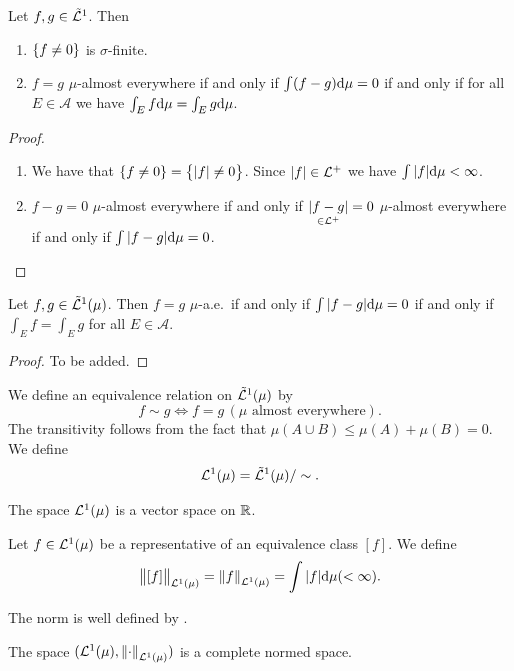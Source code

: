 \documentclass[11pt,a4paper]{article}
\newcommand{\A}{\mathcal A}
\begin{document}
\begin{proposition}
  Let $f,g \in \tilde{\mathcal{L}}^1$. Then
  \begin{enumerate}
    \item[(1)] $\left\{f \neq 0\right\}$ is $\sigma$-finite.
    \item[(2)] $f = g$ $\mu$-almost everywhere if and only if
      $\int (f - g) \mathrm{d} \mu = 0$ if and only if for all $E \in \A$ we have
      $\int_{E} f \mathrm{d} \mu = \int_{E} g \mathrm{d} \mu$.
  \end{enumerate}
\end{proposition}
\begin{proof} \phantom{}
\begin{enumerate}
  \item[(1)] We have that $\left\{f \neq 0\right\} = \left\{|f| \neq 0\right\}$.
    Since $|f| \in \mathcal{L}^+$ we have $\int |f| \mathrm{d} \mu < \infty$.
  \item[(2)] $f - g = 0$ $\mu$-almost everywhere if and only if
    $\underset{\in \mathcal{L}^+}{|f - g|} = 0$ $\mu$-almost everywhere if and only
    if $\int |f - g| \mathrm{d} \mu = 0$.
\end{enumerate}
\end{proof}

\begin{proposition}
  \label{prp:equal-a-e-implies-equal-integral}
  Let $f,g \in \tilde{\mathcal{L}}^1(\mu)$.
  Then $f = g$ $\mu$-a.e.\ if and only if
  $\int |f - g| \mathrm{d} \mu = 0$ if and only if $\int_{E} f = \int_{E} g$ for all
  $E \in \A$.
\end{proposition}
\begin{proof}
  To be added.
\end{proof}

\begin{definition}[$\L^1(\mu)$ space]
  We define an equivalence relation on $\tilde{\mathcal{L}}^1(\mu)$ by
  \[
    f \sim g \iff f = g \, (\mu \text{ almost everywhere}).
  \]
  The transitivity follows from the fact that
  $\mu(A \cup B) \le \mu(A) + \mu(B) = 0$.
  We define
  \[
    \mathcal{L}^1(\mu) = \tilde{\mathcal{L}}^1(\mu) / \sim.
  \]
\end{definition}
\begin{remark}
  The space $\L^1(\mu)$ is a vector space on $\mathbb{R}$.
\end{remark}
\begin{definition}[$\L^1(\mu)$ norm]
  Let $f \in \mathcal{L}^1(\mu)$ be a representative of an equivalence class $[f]$.
  We define
  \[
    \left\lVert[f]\right\rVert_{\mathcal{L}^1(\mu)} =
    \left\lVert f\right\rVert_{\mathcal{L}^1(\mu)} =
    \int |f| \mathrm{d} \mu (< \infty).
  \]
\end{definition}
\begin{remark}
  The norm is well defined by .
\end{remark}
\begin{remark}
  The space $(\mathcal{L}^1(\mu), \left\lVert\cdot\right\rVert_{\mathcal{L}^1(\mu)})$ is a complete normed space.
\end{remark}
\end{document}
